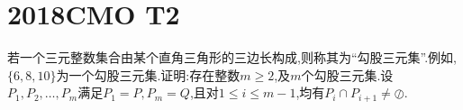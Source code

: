 \documentclass[]{article}
\title{}
\author{}
\date{}
\begin{document}
\maketitle
\section{2018CMO T2}{
若一个三元整数集合由某个直角三角形的三边长构成,则称其为“勾股三元集”.例如,$\{ 6,8,10 \}$为一个勾股三元集.证明:存在整数$m\geq 2$,及$m$个勾股三元集.设$P_1,P_2,…,P_m$满足$P_1=P,P_m=Q$,且对$1\leq i \leq m-1$,均有$P_i\cap P_{i+1}\ne \oslash$.
}
\end{document}
